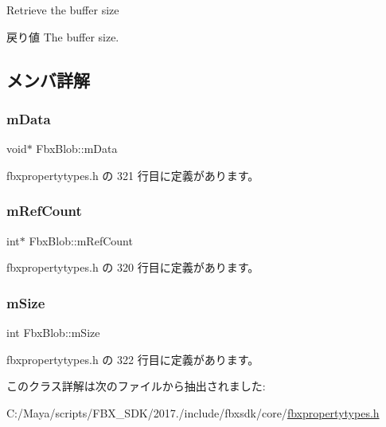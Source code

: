 Retrieve the buffer size \begin{DoxyReturn}{戻り値}
The buffer size. 
\end{DoxyReturn}


\subsection{メンバ詳解}
\mbox{\label{class_fbx_blob_af397c288f865eefa5e1fde8be443d9c2}} 
\subsubsection{\texorpdfstring{m\+Data}{mData}}
{\footnotesize\ttfamily void$\ast$ Fbx\+Blob\+::m\+Data\hspace{0.3cm}{\ttfamily [protected]}}



 fbxpropertytypes.\+h の 321 行目に定義があります。

\mbox{\label{class_fbx_blob_ac25ef6a057beb9d5f1d072a77833b910}} 
\subsubsection{\texorpdfstring{m\+Ref\+Count}{mRefCount}}
{\footnotesize\ttfamily int$\ast$ Fbx\+Blob\+::m\+Ref\+Count\hspace{0.3cm}{\ttfamily [protected]}}



 fbxpropertytypes.\+h の 320 行目に定義があります。

\mbox{\label{class_fbx_blob_a3c92f0ad0ff306800df7be4d94ac7528}} 
\subsubsection{\texorpdfstring{m\+Size}{mSize}}
{\footnotesize\ttfamily int Fbx\+Blob\+::m\+Size\hspace{0.3cm}{\ttfamily [protected]}}



 fbxpropertytypes.\+h の 322 行目に定義があります。



このクラス詳解は次のファイルから抽出されました\+:\begin{DoxyCompactItemize}
\item 
C\+:/\+Maya/scripts/\+F\+B\+X\+\_\+\+S\+D\+K/2017./include/fbxsdk/core/\hyperlink{fbxpropertytypes_8h}{fbxpropertytypes.\+h}\end{DoxyCompactItemize}
